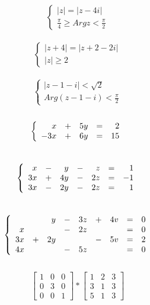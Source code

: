 \documentclass[12pt, letterpaper]{article}
\begin{document}
$$ 
\begin{cases}
|z| = |z - 4i| \\
\frac{\pi}{4}  \geq Arg z < \frac{\pi}{2}
\end{cases}
$$\\

$$
\begin{cases}
|z + 4| = |z + 2 - 2i| \\
|z| \geq 2 
\end{cases}
$$\\

$$
\begin{cases}
|z - 1 - i| < \sqrt{2} \\
Arg(z - 1 - i) < \frac{\pi}{2}
\end{cases}
$$\\

$$
\left\{
\begin{array}{r r r r r}
x & + & 5y & = & 2 \\
-3x & + & 6y & = & 15
\end{array}
\right.
$$\\

$$ 
\left\{
\begin{array}{r r r r r r r}
x & - & y & - & z & = & 1 \\
3x & + & 4y & - & 2z & = & -1 \\
3x & - & 2y & - & 2z & = & 1
\end{array}
\right.
$$\\

$$
\left\{
\begin{array}{r r r r r r r r r}
 & & y & - & 3z & + & 4v & = & 0 \\
x & & & - & 2z & & & = & 0 \\
3x & + & 2y & & & - & 5v & = & 2 \\
4x & & & - & 5z & & & = & 0
\end{array}
\right.
$$\\

$$
\begin{bmatrix}
1 & 0 & 0 \\
0 & 3 & 0 \\
0 & 0 & 1 
\end{bmatrix}
*
\begin{bmatrix}
1 & 2 &  3 \\
 3 &  1 & 3 \\
 5 &  1 &  3 
\end{bmatrix}
$$\\
\end{document}
